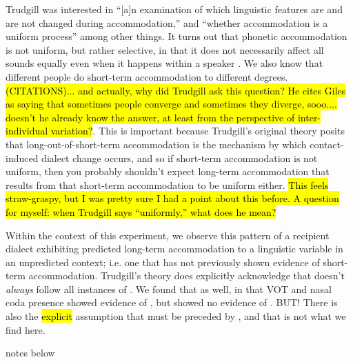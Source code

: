     Trudgill was interested in ``[a]n examination of which linguistic features are and are not changed during accommodation,'' and ``whether accommodation is a uniform process'' \citeyearpar[p. 15]{trudgill1986dialects} among other things. It turns out that phonetic accommodation is not uniform, but rather selective, in that it does not necessarily affect all sounds equally even when it happens within a speaker \citep{babel2012evidence}. We also know that different people do short-term accommodation to different degrees. \hl{(CITATIONS)... and actually, why did Trudgill ask this question? He cites Giles as saying that sometimes people converge and sometimes they diverge, sooo.... doesn't he already know the answer, at least from the perspective of inter-individual variation?}. This is important because Trudgill's original theory posits that long-out-of-short-term accommodation is the mechanism by which contact-induced dialect change occurs, and so if short-term accommodation is not uniform, then you probably shouldn't expect long-term accommodation that results from that short-term accommodation to be uniform either. \hl{This feels straw-graspy, but I was pretty sure I had a point about this before. A question for myself: when Trudgill says ``uniformly,'' what does he mean?}


    Within the context of this experiment, we observe this pattern of a recipient dialect exhibiting predicted long-term accommodation to a linguistic variable in an unpredicted context; i.e. one that has not previously shown evidence of short-term accommodation. Trudgill's theory does explicitly acknowledge that \lta{} doesn't \emph{always} follow all instances of \sta{}.  We found that as well, in that VOT and nasal coda presence showed evidence of \sta{}, but showed no evidence of \lta{}. BUT! There is also the \hl{explicit} assumption that \lta{} must be preceded by \sta{}, and that is not what we find here.

\pagebreak
notes below
\pagebreak


